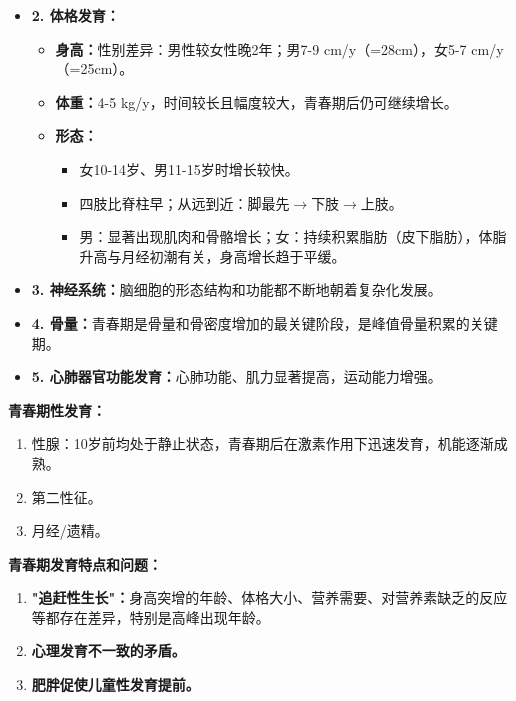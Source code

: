 \begin{keybox}
\begin{itemize}[leftmargin=*]
    \item \textbf{2. 体格发育：}
    \begin{itemize}
        \item \textbf{身高：}性别差异：男性较女性晚2年；男7-9 cm/y（=28cm），女5-7 cm/y（=25cm）。
        \item \textbf{体重：}4-5 kg/y，时间较长且幅度较大，青春期后仍可继续增长。
        \item \textbf{形态：}
        \begin{itemize}
            \item 女10-14岁、男11-15岁时增长较快。
            \item 四肢比脊柱早；从远到近：脚最先$\rightarrow$下肢$\rightarrow$上肢。
            \item 男：显著出现肌肉和骨骼增长；女：持续积累脂肪（皮下脂肪），体脂升高与月经初潮有关，身高增长趋于平缓。
        \end{itemize}
    \end{itemize}

    \item \textbf{3. 神经系统：}脑细胞的形态结构和功能都不断地朝着复杂化发展。

    \item \textbf{4. 骨量：}青春期是骨量和骨密度增加的最关键阶段，是峰值骨量积累的关键期。

    \item \textbf{5. 心肺器官功能发育：}心肺功能、肌力显著提高，运动能力增强。
\end{itemize}

\textbf{青春期性发育：}
\begin{enumerate}[leftmargin=*]
    \item 性腺：10岁前均处于静止状态，青春期后在激素作用下迅速发育，机能逐渐成熟。
    \item 第二性征。
    \item 月经/遗精。
\end{enumerate}

\textbf{青春期发育特点和问题：}
\begin{enumerate}[leftmargin=*]
    \item \textbf{"追赶性生长"：}身高突增的年龄、体格大小、营养需要、对营养素缺乏的反应等都存在差异，特别是高峰出现年龄。
    \item \textbf{心理发育不一致的矛盾。}
    \item \textbf{肥胖促使儿童性发育提前。}
\end{enumerate}
\end{keybox}

